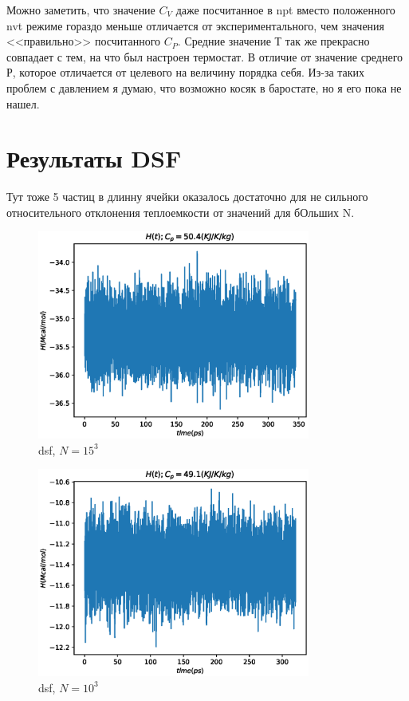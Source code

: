 \documentclass[a4paper,12pt]{article} %
\begin{document}
\newpage

Можно заметить, что значение $C_V$ даже посчитанное в npt вместо положенного nvt режиме гораздо меньше отличается от экспериментального, чем значения <<правильно>> посчитанного $C_P$. Средние значение Т так же прекрасно совпадает с тем, на что был настроен термостат. В отличие от значение среднего Р, которое отличается от целевого на величину порядка себя. Из-за таких проблем с давлением я думаю, что возможно косяк в баростате, но я его пока не нашел.

\section{Результаты DSF}

Тут тоже 5 частиц в длинну ячейки оказалось достаточно для не сильного относительного отклонения теплоемкости от значений для бОльших N.

\begin{figure}[h!]
\begin{center}
\includegraphics[width=0.8\textwidth]{./pics/dsf_H_05_N15}
\end{center}
\caption{dsf, $N = 15^3$} \label{img:dsf_H_0.05_N15}
\end{figure}

\newpage

\begin{figure}[h!]
\begin{center}
\includegraphics[width=0.8\textwidth]{./pics/dsf_H_05_N10}
\end{center}
\caption{dsf, $N = 10^3$} \label{img:dsf_H_0.05_N10}
\end{figure}
\end{document}
